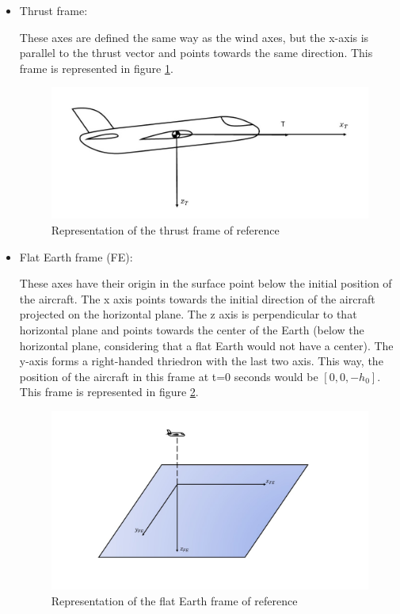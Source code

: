\begin{itemize}
\newpage

\item Thrust frame:

These axes are defined the same way as the wind axes, but the x-axis is parallel to the thrust vector and points towards the same direction. This frame is represented in figure \ref{fig:T_frame}.

\begin{figure}
\centering
\includegraphics[scale=0.4]{Images/T_frame.jpg}
\caption{Representation of the thrust frame of reference}
\label{fig:T_frame}
\end{figure}

\item Flat Earth frame (FE):

These axes have their origin in the surface point below the initial position of the aircraft. The x axis points towards the initial direction of the aircraft projected on the horizontal plane. The z axis is perpendicular to that horizontal plane and points towards the center of the Earth (below the horizontal plane, considering that a flat Earth would not have a center). The y-axis forms a right-handed thriedron with the last two axis. This way, the position of the aircraft in this frame at t=0 seconds would be $[0, 0, -h_0]$. This frame is represented in figure \ref{fig:FE_frame}.

\begin{figure}
\centering
\includegraphics[scale=0.4]{Images/FE_frame.jpg}
\caption{Representation of the flat Earth frame of reference}
\label{fig:FE_frame}
\end{figure}


\end{itemize}
